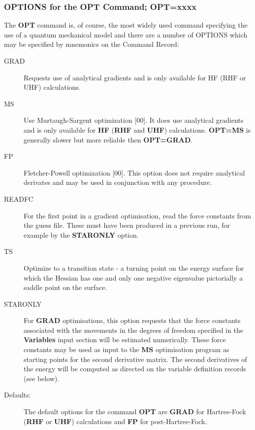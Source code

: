 \subsubsection{\sf OPTIONS for the OPT Command; OPT=xxxx}
The {\bf OPT} command is, of course, the most widely used command
specifying the use of a quantum mechanical model and there are a number
of OPTIONS which may be specified by mnemonics on the Command Record:
\begin{description}
\item[GRAD]   Requests use of analytical gradients and is only
available for HF (RHF or UHF) calculations.
\item[MS] Use Murtaugh-Sargent optimization [00]. It does use
analytical gradients and is only available for {\bf HF} ({\bf RHF} and
{\bf UHF}) calculations. {\bf OPT=MS} is generally slower but more
reliable then {\bf OPT=GRAD}.
\item[FP] Fletcher-Powell optimization [00]. This option does not
require analytical derivates and may be used in conjunction
with any procedure.
\item[READFC] For the first point in a gradient optimisation, read the force
constants from the guess file.  These must have been produced
in a previous run, for example by the {\bf STARONLY} option.
\item[TS] Optimize to a transition state - a turning point on the
energy surface for which the Hessian has one and only one negative eigenvalue
pictorially a saddle point on the surface.
\item[STARONLY] For {\bf GRAD}  optimisations, 
this option requests that the force constants associated with
the movements in the degrees of freedom specified in the
{\bf Variables} input section will be estimated numerically.
These force constants may be used as input to the {\bf MS} optimisation
program as starting points for the second derivative matrix.
The second
derivatives of the energy will be computed as directed on the variable
definition records (see below).
\item[Defaults:]
The default options for the command {\bf OPT}  are {\bf GRAD} for
Hartree-Fock ({\bf RHF} or {\bf UHF}) calculations and {\bf FP} for
post-Hartree-Fock.
\end{description}
\newpage

